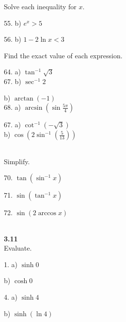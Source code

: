 \documentclass{letter}
\begin{document}
\begin{itemize}
		Solve each inequality for $x$.\\
		\begin{minipage}[t]{0.3\textwidth}
			55. b) $e^x > 5$
		\end{minipage}
		\begin{minipage}[t]{0.3\textwidth}
			56. b) $1 - 2\ln x < 3$\\
		\end{minipage}
		
		Find the exact value of each expression.\\
		\begin{minipage}[t]{0.3\textwidth}
			64. a) $\tan^{-1} \sqrt3$\\
			67. b) $\sec^{-1} 2$
		\end{minipage}
		\begin{minipage}[t]{0.3\textwidth}
			b) $\arctan(-1)$\\
			68. a) $\arcsin (\sin \frac{5\pi}{4})$
		\end{minipage}
		\begin{minipage}[t]{0.3\textwidth}
			67. a) $\cot^{-1}(-\sqrt3)$\\
			b) $\cos(2\sin^{-1}(\frac{5}{13}))$\\
		\end{minipage}\\
		
		Simplify.\\
		\begin{minipage}[t]{0.3\textwidth}
			70. $\tan(\sin^{-1} x)$
		\end{minipage}
		\begin{minipage}[t]{0.3\textwidth}
			71. $\sin(\tan^{-1} x)$
		\end{minipage}
		\begin{minipage}[t]{0.3\textwidth}
			72. $\sin (2 \arccos x)$
		\end{minipage}\\
		
		\textbf{3.11}\\
		
		Evaluate.\\
		\begin{minipage}[t]{0.2\textwidth}
			1. a) $\sinh 0$
		\end{minipage}
		\begin{minipage}[t]{0.2\textwidth}
			b) $\cosh 0$
		\end{minipage}
		\begin{minipage}[t]{0.2\textwidth}
			4. a) $\sinh 4$
		\end{minipage}
		\begin{minipage}[t]{0.2\textwidth}
			b) $\sinh(\ln 4)$\\
		\end{minipage}\\
		

\end{itemize}
\end{document}
